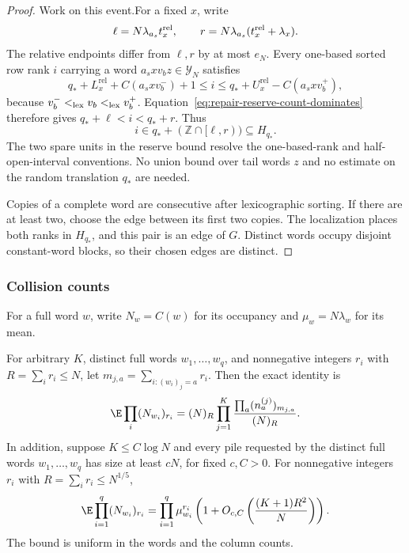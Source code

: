 \begin{proof}
Work on this event.For a fixed \(x\), write
\[
 \ell=N\lambda_{a_s}t_x^{\rm rel},\qquad
 r=N\lambda_{a_s}(t_x^{\rm rel}+\lambda_x).
\]
The relative endpoints differ from \(\ell,r\) by at most
\(e_N\).  Every one-based sorted row rank \(i\) carrying a word
\(a_sxv_bz\in\mathcal Y_N\) satisfies
\[
 q_*+L_x^{\mathrm{rel}}+C(a_sxv_b^-)+1
 \le i\le
 q_*+U_x^{\mathrm{rel}}-C(a_sxv_b^+),
\]
because \(v_b^-<_{\rm lex}v_b<_{\rm lex}v_b^+\).
Equation~\eqref{eq:repair-reserve-count-dominates} therefore gives
\(q_*+\ell<i<q_*+r\).  Thus
\[
 i\in q_*+(\mathbb Z\cap[\ell,r))\subseteq H_{q_*}.
\]
The two spare units in the reserve bound resolve the one-based-rank
and half-open-interval conventions.  No union bound over tail words
\(z\) and no estimate on the random translation \(q_*\) are needed.

Copies of a complete word are consecutive after lexicographic sorting.
If there are at least two, choose the edge between its first two copies.
The localization places both ranks in \(H_{q_*}\), and this pair
is an edge of \(G\).  Distinct words occupy disjoint constant-word
blocks, so their chosen edges are distinct.
\end{proof}
\subsubsection{Collision counts}

For a full word $w$, write $N_w=C(w)$ for its occupancy and
$\mu_w=N\lambda_w$ for its mean.

\begin{lemma}
\label{lem:fixed-column-factorial}
For arbitrary $K$, distinct full words $w_1,\ldots,w_q$, and nonnegative
integers $r_i$ with $R=\sum_i r_i\le N$, let $m_{j,a}=\sum_{i:(w_i)_j=a}r_i$.
Then the exact identity is
\[
 \E\prod_i(N_{w_i})_{r_i}
   =(N)_R\prod_{j=1}^K\frac{\prod_a(n_a^{(j)})_{m_{j,a}}}{(N)_R}.
\]
In addition, suppose $K\le C\log N$ and every pile requested by the distinct full words
$w_1,\ldots,w_q$ has size at least $cN$, for fixed $c,C>0$.
For nonnegative integers $r_i$ with $R=\sum_i r_i\le N^{1/5}$,
\begin{equation}
\label{eq:exact-fixed-column-factorials}
 \E\prod_{i=1}^q(N_{w_i})_{r_i}
 =\prod_{i=1}^q\mu_{w_i}^{r_i}
    \left(1+O_{c,C}\left(\frac{(K+1)R^2}{N}\right)\right).
\end{equation}
The bound is uniform in the words and the column counts.
\end{lemma}

